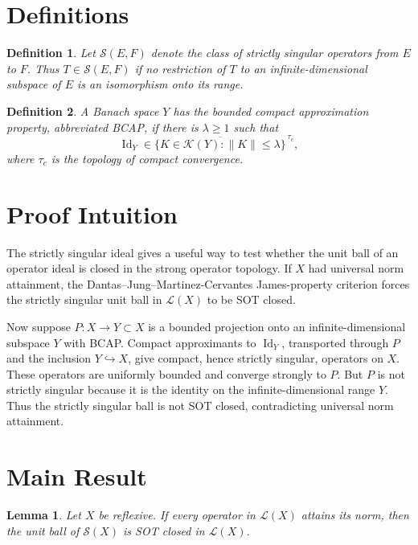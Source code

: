 \documentclass[11pt]{amsart}
\newtheorem{lemma}{Lemma}
\newtheorem{definition}{Definition}
\newcommand{\Lin}{\mathcal L}
\newcommand{\Id}{\operatorname{Id}}
\newcommand{\SSing}{\mathcal S}
\newcommand{\Comp}{\mathcal K}
\begin{document}
\section{Definitions}

\begin{definition}
Let \(\SSing(E,F)\) denote the class of strictly singular operators from
\(E\) to \(F\).  Thus \(T\in\SSing(E,F)\) if no restriction of \(T\) to an
infinite-dimensional subspace of \(E\) is an isomorphism onto its range.
\end{definition}

\begin{definition}
A Banach space \(Y\) has the bounded compact approximation property, abbreviated
BCAP, if there is \(\lambda\geq 1\) such that
\[
\Id_Y\in
\overline{\{K\in\Comp(Y):\|K\|\leq \lambda\}}^{\,\tau_c},
\]
where \(\tau_c\) is the topology of compact convergence.
\end{definition}

\section{Proof Intuition}

The strictly singular ideal gives a useful way to test whether the unit ball of
an operator ideal is closed in the strong operator topology.  If \(X\) had
universal norm attainment, the Dantas--Jung--Martinez-Cervantes James-property
criterion forces the strictly singular unit ball in \(\Lin(X)\) to be SOT
closed.

Now suppose \(P:X\to Y\subset X\) is a bounded projection onto an
infinite-dimensional subspace \(Y\) with BCAP.  Compact approximants to
\(\Id_Y\), transported through \(P\) and the inclusion \(Y\hookrightarrow X\),
give compact, hence strictly singular, operators on \(X\).  These operators are
uniformly bounded and converge strongly to \(P\).  But \(P\) is not strictly
singular because it is the identity on the infinite-dimensional range \(Y\).
Thus the strictly singular ball is not SOT closed, contradicting universal norm
attainment.

\section{Main Result}

\begin{lemma}\label{lem:ss-sot-closed}
Let \(X\) be reflexive.  If every operator in \(\Lin(X)\) attains its norm,
then the unit ball of \(\SSing(X)\) is SOT closed in \(\Lin(X)\).
\end{lemma}
\end{document}
